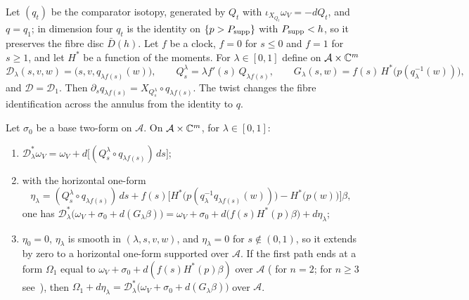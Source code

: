 Let $(q_t)$ be the comparator isotopy, generated by $Q_t$ with $\iota_{X_{Q_t}}\omega_V=-dQ_t$, and $q=q_1$; in dimension
four $q_t$ is the identity on $\{p>P_{\rm supp}\}$ with $P_{\rm supp}<h$, so it preserves the fibre disc $\bar D(h)$.
Let $f$ be a clock, $f=0$ for $s\le0$ and $f=1$ for $s\ge1$, and let $H^*$ be a function of the moments. For
$\lambda\in[0,1]$ define on $\mathcal A\times\mathbb{C}^m$
\begin{equation}\label{eq:hdl-twist}
 \mathcal D_\lambda(s,v,w)=\big(s,v,q_{\lambda f(s)}(w)\big),\qquad
 Q^\lambda_s=\lambda f'(s)\,Q_{\lambda f(s)},\qquad
 G_\lambda(s,w)=f(s)\,H^*\big(p(q_\lambda^{-1}(w))\big),
\end{equation}
and $\mathcal D=\mathcal D_1$. Then $\partial_sq_{\lambda f(s)}=X_{Q^\lambda_s}\circ q_{\lambda f(s)}$. The twist changes
the fibre identification across the annulus from the identity to $q$.

\begin{lemma}[Suspension]\label{lem:hdl-suspension}
Let $\sigma_0$ be a base two-form on $\mathcal A$. On $\mathcal A\times\mathbb{C}^m$, for $\lambda\in[0,1]$:
\begin{enumerate}[label=(\roman*)]
\item $\mathcal D_\lambda^*\omega_V=\omega_V+d\big[(Q^\lambda_s\circ q_{\lambda f(s)})\,ds\big]$;
\item with the horizontal one-form
\[
 \eta_\lambda=(Q^\lambda_s\circ q_{\lambda f(s)})\,ds
 +f(s)\Big[H^*\big(p(q_\lambda^{-1}q_{\lambda f(s)}(w))\big)-H^*\big(p(w)\big)\Big]\beta ,
\]
one has
$\mathcal D_\lambda^*\big(\omega_V+\sigma_0+d(G_\lambda\beta)\big)=\omega_V+\sigma_0+d\big(f(s)H^*(p)\beta\big)+d\eta_\lambda$;
\item $\eta_0=0$, $\eta_\lambda$ is smooth in $(\lambda,s,v,w)$, and $\eta_\lambda=0$ for $s\notin(0,1)$, so it extends
by zero to a horizontal one-form supported over $\mathcal A$. If the first path ends at a form $\Omega_1$ equal to
$\omega_V+\sigma_0+d(f(s)H^*(p)\beta)$ over $\mathcal A$ ( for $n=2$; for $n\ge3$
see~\cite{SongHD}), then
$\Omega_1+d\eta_\lambda=\mathcal D_\lambda^*\big(\omega_V+\sigma_0+d(G_\lambda\beta)\big)$ over $\mathcal A$.
\end{enumerate}
\end{lemma}

